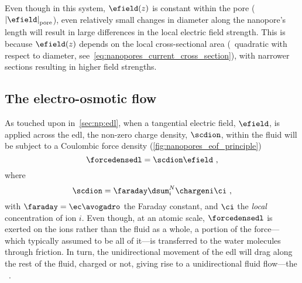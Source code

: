 %
Even though in this system, $\efield (z)$ is constant within the pore ($\left| \efield
\right|_{\text{pore}}$), even relatively small changes in diameter along the nanopore's length will result in
large differences in the local electric field strength. This is because $\efield (z)$ depends on the local
cross-sectional area (\ie~quadratic with respect to diameter, see~\cref{eq:nanopores_current_cross_section}),
with narrower sections resulting in higher field strengths.


\subsection{The electro-osmotic flow}
%
\label{sec:np:eof}
%

As touched upon in~\cref{sec:np:edl}, when a tangential electric field, $\efield$, is applied across the
\gls{edl}, the non-zero charge density, $\scdion$, within the fluid will be subject to a Coulombic force
density (\cref{fig:nanopores_eof_principle})
%
\begin{equation}\label{eq:nanopores_edl_force}
  \forcedensedl = \scdion \efield
  \text{ ,}
\end{equation}
%
where
%
\begin{equation}\label{eq:nanopores_ion_scd}
  \scdion = \faraday \dsum_i^N \chargeni \ci
  \text{ ,}
\end{equation}
%
with $\faraday = \ec \avogadro$ the Faraday constant, and $\ci$ the \emph{local} concentration of ion $i$.
Even though, at an atomic scale, $\forcedensedl$ is exerted on the ions rather than the fluid as a whole, a
portion of the force---which typically assumed to be all of it---is transferred to the water molecules through
friction. In turn, the unidirectional movement of the \gls{edl} will drag along the rest of the fluid, charged
or not, giving rise to a unidirectional fluid flow---the ~\cite{Bocquet-2010}.


